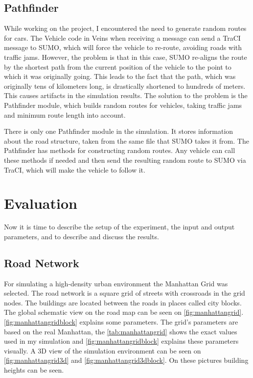 \documentclass[]{nsm-thesis}
\begin{document}
\section{Pathfinder}

While working on the project, I encountered the need to generate random routes for cars. The Vehicle code in Veins when receiving a message can send a TraCI message to SUMO, which will force the vehicle to re-route, avoiding roads with traffic jams. However, the problem is that in this case, SUMO re-aligns the route by the shortest path from the current position of the vehicle to the point to which it was originally going. This leads to the fact that the path, which was originally tens of kilometers long, is drastically shortened to hundreds of meters. This causes artifacts in the simulation results. The solution to the problem is the Pathfinder module, which builds random routes for vehicles, taking traffic jams and minimum route length into account.

There is only one Pathfinder module in the simulation. It stores information about the road structure, taken from the same file that SUMO takes it from. The Pathfinder has methods for constructing random routes. Any vehicle can call these methods if needed and then send the resulting random route to SUMO via TraCI, which will make the vehicle to follow it.



\chapter{Evaluation}

Now it is time to describe the setup of the experiment, the input and output parameters, and to describe and discuss the results.



\section{Road Network}

For simulating a high-density urban environment the Manhattan Grid was selected. The road network is a square grid of streets with crossroads in the grid nodes. The buildings are located between the roads in places called city blocks. The global schematic view on the road map can be seen on \cref{fig:manhattangrid}. \cref{fig:manhattangridblock} explains some parameters. The grid's parameters are based on the real Manhattan, the \cref{tab:manhattangrid} shows the exact values used in my simulation and \cref{fig:manhattangridblock} explains these parameters visually. A 3D view of the simulation environment can be seen on \cref{fig:manhattangrid3d} and \cref{fig:manhattangrid3dblock}. On these pictures building heights can be seen.
\end{document}
